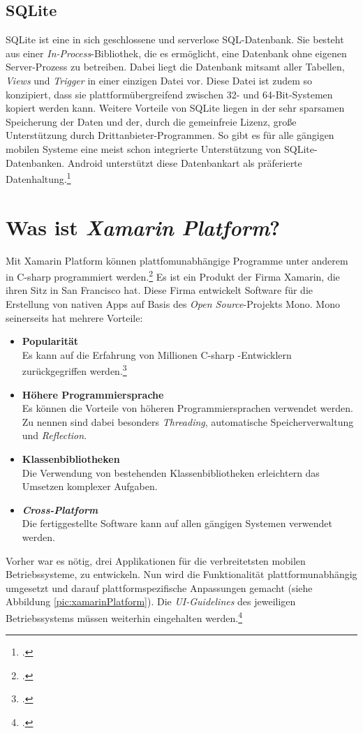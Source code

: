 \subsection{SQLite}
\label{ssec:android-sqlite}
SQLite ist eine in sich geschlossene und serverlose \ac{SQL}-Datenbank. Sie besteht aus einer \textit{In-Process}-Bibliothek, die es ermöglicht, eine Datenbank ohne eigenen Server-Prozess zu betreiben. Dabei liegt die Datenbank mitsamt aller Tabellen, \textit{Views} und \textit{\gls{Trigger}} in einer einzigen Datei vor. Diese Datei ist zudem so konzipiert, dass sie plattformübergreifend zwischen 32- und 64-Bit-Systemen kopiert werden kann. Weitere Vorteile von SQLite liegen in der sehr sparsamen Speicherung der Daten und der, durch die gemeinfreie Lizenz, große Unterstützung durch Drittanbieter-Programmen. So gibt es für alle gängigen mobilen Systeme eine meist schon integrierte Unterstützung von SQLite-Datenbanken. Android unterstützt diese Datenbankart als präferierte Datenhaltung.\footcite[S. 226f.]{Android-BeckerPant}
\section{Was ist \textit{Xamarin Platform}?}
\label{sec:defintion-xamarin}
Mit Xamarin Platform können plattfomunabhängige Programme unter anderem in \gls{C-sharp} programmiert werden.\footcite{Xamarin-Multiplatform} Es ist ein Produkt der Firma Xamarin, die ihren Sitz in San Francisco hat. Diese Firma entwickelt Software für die Erstellung von nativen Apps auf Basis des \textit{Open Source}-Projekts \gls{Mono}. Mono seinerseits hat mehrere Vorteile:
\begin{itemize}
\item \textbf{Popularität}\\Es kann auf die Erfahrung von Millionen \gls{C-sharp} -Entwicklern zurückgegriffen werden.\footcite{Xamarin-Platform}
\item \textbf{Höhere Programmiersprache} \\Es können die Vorteile von höheren Programmiersprachen verwendet werden. Zu nennen sind dabei besonders \textit{Threading}, automatische Speicherverwaltung und \textit{\gls{Reflection}}.
\item \textbf{Klassenbibliotheken}\\Die Verwendung von bestehenden Klassenbibliotheken erleichtern das Umsetzen komplexer Aufgaben.
\item \textbf{\textit{Cross-Platform}}\\Die fertiggestellte Software kann auf allen gängigen Systemen verwendet werden.
\end{itemize}
Vorher war es nötig, drei Applikationen für die verbreitetsten mobilen Betriebssysteme, zu entwickeln. Nun wird die Funktionalität plattformunabhängig umgesetzt und darauf plattformspezifische Anpassungen gemacht (siehe Abbildung \ref{pic:xamarinPlatform}). Die \textit{UI-Guidelines} des jeweiligen Betriebssystems müssen weiterhin eingehalten werden.\footcite{Xamarin-Platform}
